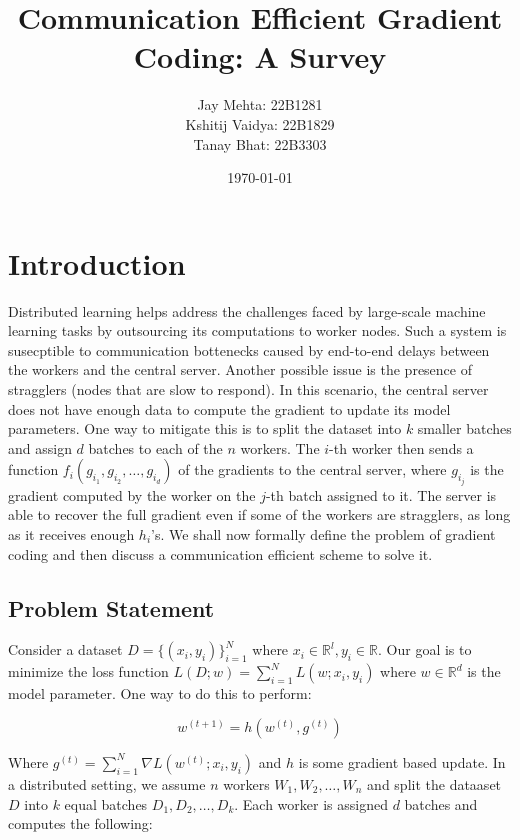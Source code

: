 \documentclass{report}
\title{Communication Efficient Gradient Coding: A Survey}
\author{Jay Mehta: 22B1281\\
        Kshitij Vaidya: 22B1829\\
        Tanay Bhat: 22B3303}
\date{\today}
\theoremstyle{definition}
\begin{document}
\maketitle

\tableofcontents

\chapter{Introduction}

Distributed learning helps address the challenges faced by large-scale machine learning tasks by outsourcing its computations to worker nodes. Such a system is susecptible to communication bottenecks caused by end-to-end delays between the workers and the central server. Another possible issue is the presence of stragglers (nodes that are slow to respond). In this scenario, the central server does not have enough data to compute the gradient to update its model parameters. One way to mitigate this is to split the dataset into $k$ smaller batches and assign $d$ batches to each of the $n$ workers. The $i$-th worker then sends a function $f_i(g_{i_1}, g_{i_2}, \ldots, g_{i_d})$ of the gradients to the central server, where $g_{i_j}$ is the gradient computed by the worker on the $j$-th batch assigned to it. The server is able to recover the full gradient even if some of the workers are stragglers, as long as it receives enough $h_i$'s. We shall now formally define the problem of gradient coding and then discuss a communication efficient scheme to solve it.

\section{Problem Statement}

Consider a dataset $D = \{(x_i, y_i)\}_{i=1}^N$ where $x_i \in \mathbb{R}^l, y_i \in \mathbb{R}$. Our goal is to minimize the loss function $L(D; w) =  \sum_{i=1}^N L(w; x_i, y_i)$ where $w \in \mathbb{R}^d$ is the model parameter. One way to do this to perform:

\begin{equation}
    w^{(t+1)} = h(w^{(t)}, g^{(t)})
\end{equation}

Where $g^{(t)} = \sum_{i=1}^N \nabla L(w^{(t)}; x_i, y_i)$ and $h$ is some gradient based update. In a distributed setting, we assume $n$ workers $W_1, W_2, \ldots, W_n$ and split the dataaset $D$ into $k$ equal batches $D_1, D_2, \ldots, D_k$. Each worker is assigned $d$ batches and computes the following:
\end{document}

